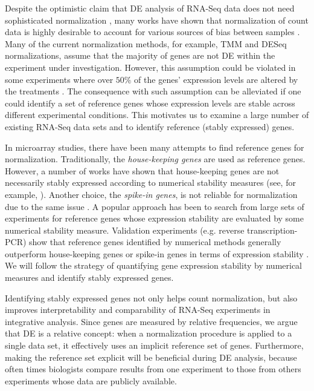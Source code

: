 Despite the optimistic claim that DE analysis of RNA-Seq data does not need 
sophisticated normalization \citep{wang2009rna}, many works have shown that normalization of count 
data is highly desirable to account for various sources of bias between samples
\citep{anders2010differential,dillies2013comprehensive,hansen2012removing, risso2014nat,
	risso2011gc,robinson2010scaling}.
Many of the current normalization methods, for example, TMM \citep{robinson2010scaling} and DESeq
\citep{anders2010differential} normalizations, assume that the majority of genes are not DE within
the experiment under investigation. However, this assumption could be violated in some experiments
where over $50\%$ of the genes' expression levels are altered by the treatments
\citep{loven2012revisiting, wu2013use}. The consequence with such assumption can be alleviated if
one could identify a set of reference genes whose expression levels are stable across
different experimental conditions. This motivates us to examine a large number of existing RNA-Seq 
data sets and to identify reference (stably expressed) genes. 

In microarray studies, there have been many attempts to find reference genes for normalization.
Traditionally, the \textit{house-keeping genes}  are used as reference genes.
However, a number of works have shown that house-keeping genes are not necessarily stably expressed
according to numerical stability measures (see, for example,
\cite{czechowski2005genome,huggett2005real}). Another choice, the \textit{spike-in genes}, is not
reliable for normalization due to the same issue \citep{risso2014nat}. A popular approach has been
to search from large sets of experiments for reference genes
\citep{czechowski2005genome,dekkers2012identification,frericks2008toolbox,gur2009identification,stamova2009identification}
whose expression stability are evaluated by some numerical stability measure. Validation 
experiments (e.g. reverse
transcription-PCR) show that reference genes identified by numerical methods generally outperform 
house-keeping genes or spike-in genes in terms of expression stability 
\citep{czechowski2005genome,hruz2011refgenes}.
We will follow the strategy of quantifying gene expression stability by numerical measures and
identify stably expressed genes.

Identifying stably expressed genes not only helps count normalization, but also improves
interpretability and comparability of RNA-Seq experiments in integrative analysis. Since genes are
measured by relative frequencies, we argue that DE is a relative concept: when a normalization
procedure is applied to a single data set, it effectively uses an implicit reference set of genes.
Furthermore, making the reference set explicit will be beneficial during DE analysis, because often 
times biologists compare results from one experiment to those from others experiments whose data 
are publicly
available. 

